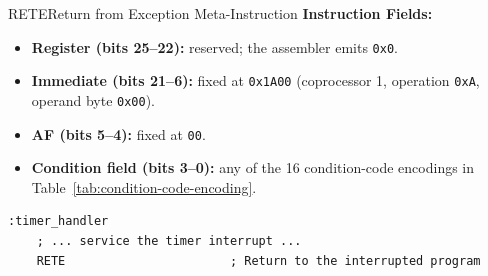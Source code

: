 \begin{instructionbox}{RETE}{Return from Exception Meta-Instruction}
	\textbf{Instruction Fields:}
	\begin{itemize}
		\item \textbf{Register (bits 25--22):} reserved; the assembler emits \texttt{0x0}.
		\item \textbf{Immediate (bits 21--6):} fixed at \texttt{0x1A00} (coprocessor 1, operation \texttt{0xA},
		      operand byte \texttt{0x00}).
		\item \textbf{AF (bits 5--4):} fixed at \texttt{00}.
		\item \textbf{Condition field (bits 3--0):} any of the 16 condition-code encodings in
		      Table~\ref{tab:condition-code-encoding}.
	\end{itemize}

	\begin{example}
		\begin{lstlisting}
:timer_handler
    ; ... service the timer interrupt ...
    RETE                       ; Return to the interrupted program
		\end{lstlisting}
		\caption{Returning from an Interrupt Handler}
	\end{example}
\end{instructionbox}

